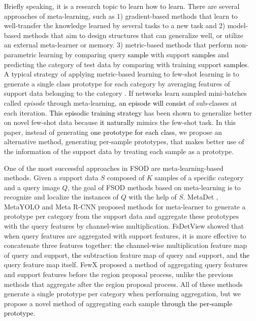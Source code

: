 \documentclass[10pt,twocolumn,letterpaper]{article}
\newcommand{\nj}[1]{\textcolor{black}{#1}}
\begin{document}
\vspace{+0.08cm}
\quad Briefly speaking, it is a research topic to learn how to learn. There are several approaches of meta-learning, such as 1) gradient-based methods \cite{finn2017model, li2018learning} that learn to well-transfer the knowledge learned by several tasks to a new task and 2) model-based methods \cite{munkhdalai2017meta, ravi2016optimization} that aim to design structures that can generalize well, or utilize an external meta-learner or memory. 3) metric-based methods \cite{snell2017prototypical, vinyals2016matching, ren2018meta, yang2021free} that perform non-parametric learning by comparing query \nj{sample} with support \nj{samples} and predicting the category of test data by comparing with training support \nj{samples}. A typical strategy of applying metric-based learning to few-shot learning is to generate a single class prototype for each category by averaging features of support data belonging to the category \cite{snell2017prototypical, vinyals2016matching, sung2018learning}. 
If networks learn sampled mini-batches called \emph{episode} through meta-learning, \nj{an episode will consist} of sub-classes at each iteration. \nj{This episodic training strategy} has been shown to generalize better on novel few-shot data because \nj{it naturally} mimics the few-shot task. In this paper, instead of generating \nj{one prototype for each class}, we propose an alternative method, generating per-sample prototypes, that makes better use of the information of the support data by treating each sample as a prototype.


\vspace{+0.15cm}
\quad One of the most successful approaches in FSOD are meta-learning-based methods. Given a support data $S$ composed of $K$ samples of a specific category and a query image $Q$, the goal of FSOD methods based on meta-learning is to recognize and localize the instances of $Q$ with the help of $S$. MetaDet \cite{wang2019meta}, MetaYOLO \cite{kang2019few} and Meta R-CNN \cite{yan2019meta} proposed methods for meta-learner to generate a prototype per category from the support data and aggregate these prototypes with the query features by channel-wise multiplication. FsDetView \cite{xiao2020few} showed that when query features are aggregated with support features, it is more effective to concatenate three features together: \nj{the} channel-wise multiplication feature map of query and support, \nj{the} subtraction feature map of query and support, and \nj{the} query feature map itself. FewX \cite{fan2020fsod} proposed a method of aggregating query features and support features before the region proposal process, unlike the previous methods that aggregate after the region proposal process. All of these methods generate a single prototype per category when performing aggregation, but we propose a novel method of aggregating each sample \nj{through the per-sample prototype.}
\end{document}
